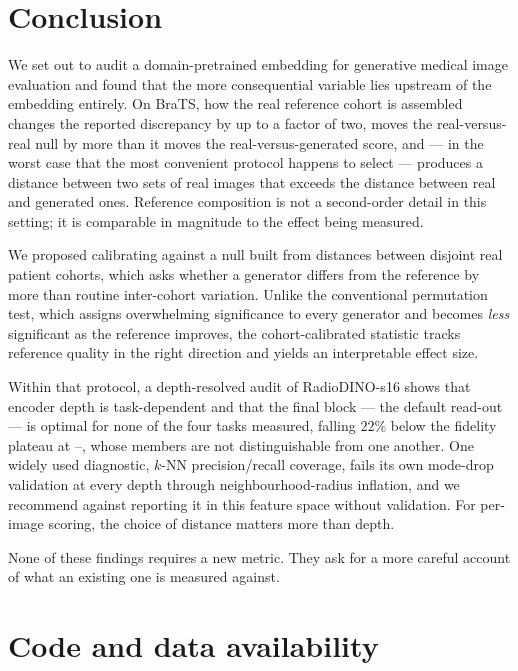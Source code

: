 \section{Conclusion}
\label{sec:conclusion}

We set out to audit a domain-pretrained embedding for generative medical image
evaluation and found that the more consequential variable lies upstream of the
embedding entirely. On BraTS, how the real reference cohort is assembled changes
the reported discrepancy by up to a factor of two, moves the real-versus-real
null by more than it moves the real-versus-generated score, and --- in the
worst case that the most convenient protocol happens to select --- produces a
distance between two sets of real images that exceeds the distance between real
and generated ones. Reference composition is not a second-order detail in this
setting; it is comparable in magnitude to the effect being measured.

We proposed calibrating against a null built from distances between disjoint
real patient cohorts, which asks whether a generator differs from the reference
by more than routine inter-cohort variation. Unlike the conventional
permutation test, which assigns overwhelming significance to every generator and
becomes \emph{less} significant as the reference improves, the cohort-calibrated
statistic tracks reference quality in the right direction and yields an
interpretable effect size.

Within that protocol, a depth-resolved audit of RadioDINO-s16 shows that
encoder depth is task-dependent and that the final block --- the default
read-out --- is optimal for none of the four tasks measured, falling $22\%$
below the fidelity plateau at --, whose members are not
distinguishable from one another. One widely used diagnostic, $k$-NN
precision/recall coverage, fails its own mode-drop validation at every depth
through neighbourhood-radius inflation, and we recommend against reporting it
in this feature space without validation. For per-image scoring, the choice of
distance matters more than depth.

None of these findings requires a new metric. They ask for a more careful
account of what an existing one is measured against.

\section*{Code and data availability}

